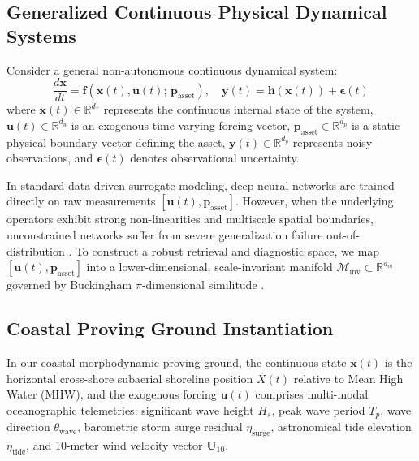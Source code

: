 \documentclass[journal]{IEEEtran}
\begin{document}
\subsection{Generalized Continuous Physical Dynamical Systems}
Consider a general non-autonomous continuous dynamical system:
\begin{equation}
\frac{d\mathbf{x}}{dt} = \mathbf{f}\left(\mathbf{x}(t), \mathbf{u}(t);\, \mathbf{p}_{\text{asset}}\right), \quad \mathbf{y}(t) = \mathbf{h}(\mathbf{x}(t)) + \boldsymbol{\epsilon}(t)
\label{eq:general_dynamical_system}
\end{equation}
where $\mathbf{x}(t) \in \mathbb{R}^{d_x}$ represents the continuous internal state of the system, $\mathbf{u}(t) \in \mathbb{R}^{d_u}$ is an exogenous time-varying forcing vector, $\mathbf{p}_{\text{asset}} \in \mathbb{R}^{d_p}$ is a static physical boundary vector defining the asset, $\mathbf{y}(t) \in \mathbb{R}^{d_y}$ represents noisy observations, and $\boldsymbol{\epsilon}(t)$ denotes observational uncertainty.

In standard data-driven surrogate modeling, deep neural networks are trained directly on raw measurements $[\mathbf{u}(t), \mathbf{p}_{\text{asset}}]$. However, when the underlying operators exhibit strong non-linearities and multiscale spatial boundaries, unconstrained networks suffer from severe generalization failure out-of-distribution \cite{raissi2019pinns,lu2021deeponet}. To construct a robust retrieval and diagnostic space, we map $[\mathbf{u}(t), \mathbf{p}_{\text{asset}}]$ into a lower-dimensional, scale-invariant manifold $\mathcal{M}_{\text{inv}} \subset \mathbb{R}^{d_m}$ governed by Buckingham $\pi$-dimensional similitude \cite{buckingham1914physically}.

\subsection{Coastal Proving Ground Instantiation}
In our coastal morphodynamic proving ground, the continuous state $\mathbf{x}(t)$ is the horizontal cross-shore subaerial shoreline position $X(t)$ relative to Mean High Water (MHW), and the exogenous forcing $\mathbf{u}(t)$ comprises multi-modal oceanographic telemetries: significant wave height $H_s$, peak wave period $T_p$, wave direction $\theta_{\text{wave}}$, barometric storm surge residual $\eta_{\text{surge}}$, astronomical tide elevation $\eta_{\text{tide}}$, and 10-meter wind velocity vector $\mathbf{U}_{10}$.
\end{document}
